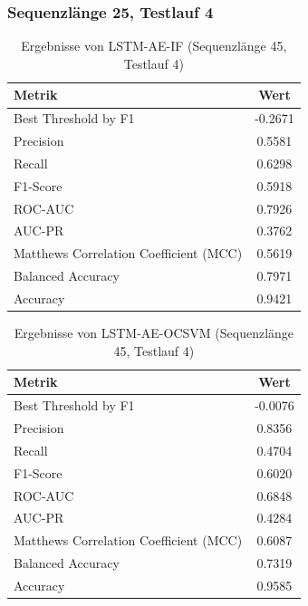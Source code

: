\documentclass[a4paper,12pt]{article}
\begin{document}
\subsubsection{Sequenzlänge 25, Testlauf 4}
\begin{table}[H]
	\centering
	\caption{Ergebnisse von LSTM-AE-IF (Sequenzlänge 45, Testlauf 4)}
	\begin{tabular}{lc}
		\hline
		Metrik & Wert \\
		\hline
		Best Threshold by F1 & -0.2671 \\
		Precision & 0.5581 \\
		Recall & 0.6298 \\
		F1-Score & 0.5918 \\
		ROC-AUC & 0.7926 \\
		AUC-PR & 0.3762 \\
		Matthews Correlation Coefficient (MCC) & 0.5619 \\
		Balanced Accuracy & 0.7971 \\
		Accuracy & 0.9421 \\
		\hline
	\end{tabular}
\end{table}

\begin{table}[H]
	\centering
	\caption{Ergebnisse von LSTM-AE-OCSVM (Sequenzlänge 45, Testlauf 4)}
	\begin{tabular}{lc}
		\hline
		Metrik & Wert \\
		\hline
		Best Threshold by F1 & -0.0076 \\
		Precision & 0.8356 \\
		Recall & 0.4704 \\
		F1-Score & 0.6020 \\
		ROC-AUC & 0.6848 \\
		AUC-PR & 0.4284 \\
		Matthews Correlation Coefficient (MCC) & 0.6087 \\
		Balanced Accuracy & 0.7319 \\
		Accuracy & 0.9585 \\
		\hline
	\end{tabular}
\end{table}
\end{document}
